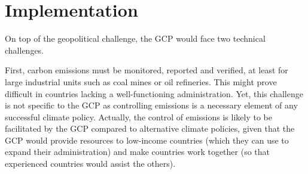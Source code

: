 \documentclass[12pt,english]{article}
\begin{document}
%         

\section{Implementation}\label{sec:implementation}

On top of the geopolitical challenge, %
the GCP would face two technical challenges. 

First, carbon emissions must be monitored, reported and verified, at least for large industrial units such as coal mines or oil refineries. This might prove difficult in countries lacking a well-functioning administration. Yet, this challenge is not specific to the GCP as controlling emissions is a necessary element of any successful climate policy. Actually, the control of emissions is likely to be facilitated by the GCP compared to alternative climate policies, given that the GCP would provide resources to low-income countries (which they can use to expand their administration) and make countries work together (so that experienced countries would assist the others). 
\end{document}
